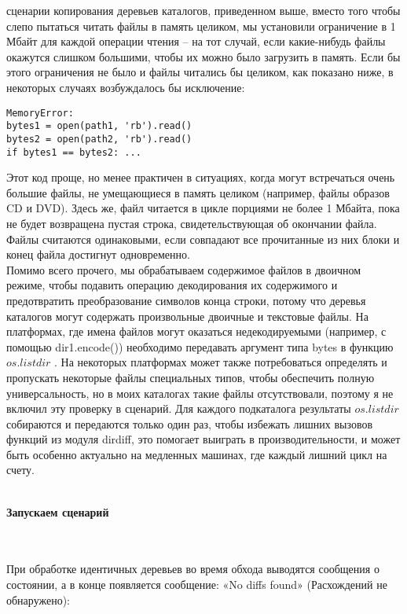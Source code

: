 \documentclass[12pt]{article}
\begin{document}
сценарии копирования деревьев каталогов, приведенном выше,
вместо того чтобы слепо пытаться читать файлы в память целиком, мы
установили ограничение в 1 Мбайт для каждой операции чтения – на
тот случай, если какие-нибудь файлы окажутся слишком большими,
чтобы их можно было загрузить в память. Если бы этого ограничения не было и файлы читались бы целиком, как
показано ниже, в некоторых случаях возбуждалось бы исключение:
\begin{verbatim}
MemoryError:
bytes1 = open(path1, 'rb').read()
bytes2 = open(path2, 'rb').read()
if bytes1 == bytes2: ...
\end{verbatim}
Этот код проще, но менее практичен в ситуациях, когда могут встречаться очень большие файлы, не умещающиеся в память целиком
(например, файлы образов CD и DVD). Здесь же, файл читается
в цикле порциями не более 1 Мбайта, пока не будет возвращена пустая
строка, свидетельствующая об окончании файла. Файлы считаются
одинаковыми, если совпадают все прочитанные из них блоки и конец
файла достигнут одновременно. \\
Помимо всего прочего, мы обрабатываем содержимое файлов в двоичном режиме, чтобы подавить операцию декодирования их содержимого
и предотвратить преобразование символов конца строки, потому что
деревья каталогов могут содержать произвольные двоичные и текстовые файлы. На платформах,
где имена файлов могут оказаться недекодируемыми (например, с помощью dir1.encode()) необходимо передавать аргумент типа bytes в функцию $os.listdir$ . На некоторых платформах может также потребоваться определять и пропускать некоторые файлы специальных типов,
чтобы обеспечить полную универсальность, но в моих каталогах такие
файлы отсутствовали, поэтому я не включил эту проверку в сценарий. Для
каждого подкаталога результаты $os.listdir$ собираются и передаются только один раз, чтобы избежать лишних вызовов функций из
модуля dirdiff, это помогает выиграть в производительности, и может быть особенно актуально на медленных машинах, где каждый лишний цикл на счету.\\
\\
\begin{large}
\textbf{Запускаем сценарий}
\end{large}
\\
\\
При обработке идентичных деревьев во время обхода выводятся сообщения о состоянии, а в конце появляется сообщение: «No
diffs found» (Расхождений не обнаружено):
\end{document}
